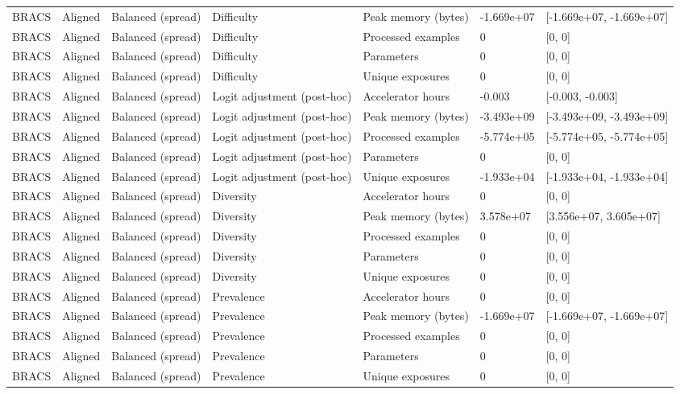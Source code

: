 \begin{longtable}{lllllll}
BRACS & Aligned & Balanced (spread) & Difficulty & Peak memory (bytes) & -1.669e+07 & [-1.669e+07, -1.669e+07] \\
BRACS & Aligned & Balanced (spread) & Difficulty & Processed examples & 0 & [0, 0] \\
BRACS & Aligned & Balanced (spread) & Difficulty & Parameters & 0 & [0, 0] \\
BRACS & Aligned & Balanced (spread) & Difficulty & Unique exposures & 0 & [0, 0] \\
BRACS & Aligned & Balanced (spread) & Logit adjustment (post-hoc) & Accelerator hours & -0.003 & [-0.003, -0.003] \\
BRACS & Aligned & Balanced (spread) & Logit adjustment (post-hoc) & Peak memory (bytes) & -3.493e+09 & [-3.493e+09, -3.493e+09] \\
BRACS & Aligned & Balanced (spread) & Logit adjustment (post-hoc) & Processed examples & -5.774e+05 & [-5.774e+05, -5.774e+05] \\
BRACS & Aligned & Balanced (spread) & Logit adjustment (post-hoc) & Parameters & 0 & [0, 0] \\
BRACS & Aligned & Balanced (spread) & Logit adjustment (post-hoc) & Unique exposures & -1.933e+04 & [-1.933e+04, -1.933e+04] \\
BRACS & Aligned & Balanced (spread) & Diversity & Accelerator hours & 0 & [0, 0] \\
BRACS & Aligned & Balanced (spread) & Diversity & Peak memory (bytes) & 3.578e+07 & [3.556e+07, 3.605e+07] \\
BRACS & Aligned & Balanced (spread) & Diversity & Processed examples & 0 & [0, 0] \\
BRACS & Aligned & Balanced (spread) & Diversity & Parameters & 0 & [0, 0] \\
BRACS & Aligned & Balanced (spread) & Diversity & Unique exposures & 0 & [0, 0] \\
BRACS & Aligned & Balanced (spread) & Prevalence & Accelerator hours & 0 & [0, 0] \\
BRACS & Aligned & Balanced (spread) & Prevalence & Peak memory (bytes) & -1.669e+07 & [-1.669e+07, -1.669e+07] \\
BRACS & Aligned & Balanced (spread) & Prevalence & Processed examples & 0 & [0, 0] \\
BRACS & Aligned & Balanced (spread) & Prevalence & Parameters & 0 & [0, 0] \\
BRACS & Aligned & Balanced (spread) & Prevalence & Unique exposures & 0 & [0, 0] \\

\end{longtable}
